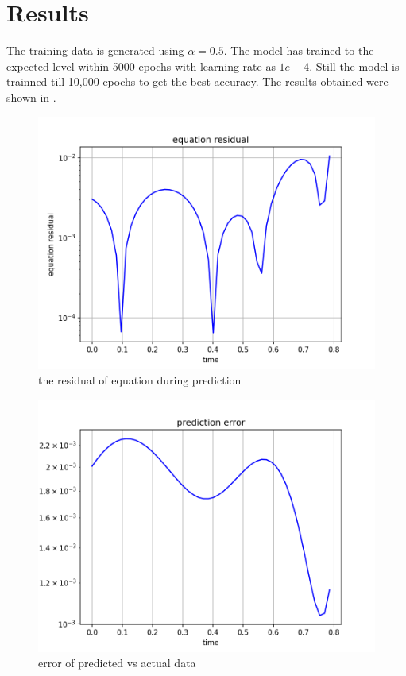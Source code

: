 \documentclass{article}
\begin{document}
\section{Results}
The training data is generated using \(\alpha = 0.5\). The model has trained
to the expected level within 5000 epochs with learning rate as \(1e-4\). Still
the model is trainned till 10,000 epochs to get the best accuracy. The
results obtained were shown in .

\begin{figure}[!h]
	\centering
	\includegraphics[scale = 0.5]{supportingFiles/residual.png}
	\caption{the residual of equation during prediction}
	\label{residualFig}
\end{figure}

\begin{figure}[!h]
	\centering
	\includegraphics[scale = 0.5]{supportingFiles/error.png}
	\caption{error of predicted vs actual data}
	\label{errorFig}
\end{figure}
\end{document}
